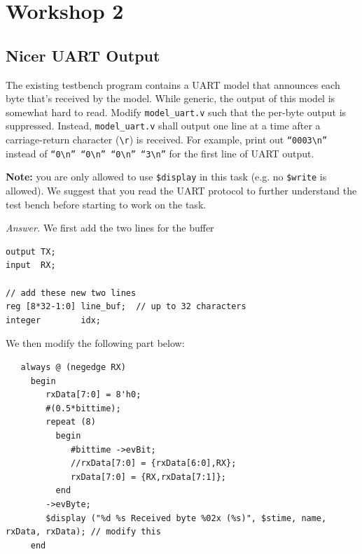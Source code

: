 \documentclass[10pt,letterpaper]{article}
\begin{document}
\section{Workshop 2}

\subsection{Nicer UART Output}

The existing testbench program contains a UART model that announces each byte that’s received by the model. While generic, the output of this model is somewhat hard to read. Modify \texttt{model\_uart.v} such that the per-byte output is suppressed. Instead, \texttt{model\_uart.v} shall output one line at a time after a carriage-return character (\texttt{\textbackslash r}) is received. For example, print out \texttt{``0003\textbackslash n''} instead of \texttt{``0\textbackslash n'' ``0\textbackslash n'' ``0\textbackslash n'' ``3\textbackslash n''} for the first line of UART output.

\textbf{Note:} you are only allowed to use \texttt{\$display} in this task (e.g. no \texttt{\$write} is allowed). We suggest that you read the UART protocol to further understand the test bench before starting to work on the task.

\textit{Answer.} We first add the two lines for the buffer\\

\begin{mdframed}
\begin{verbatim}
output TX;
input  RX;

// add these new two lines
reg [8*32-1:0] line_buf;  // up to 32 characters
integer        idx;
\end{verbatim}
\end{mdframed}

We then modify the following part below:\\

\begin{mdframed}
\begin{verbatim}
   always @ (negedge RX)
     begin
        rxData[7:0] = 8'h0;
        #(0.5*bittime);
        repeat (8)
          begin
             #bittime ->evBit;
             //rxData[7:0] = {rxData[6:0],RX};
             rxData[7:0] = {RX,rxData[7:1]};
          end
        ->evByte;
        $display ("%d %s Received byte %02x (%s)", $stime, name, rxData, rxData); // modify this
     end
\end{verbatim}
\end{mdframed}
\end{document}
